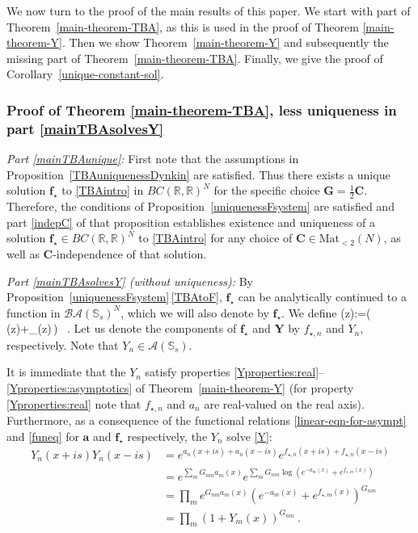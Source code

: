 \documentclass[12pt]{article}
\theoremstyle{plain}
\theoremstyle{definition}
\numberwithin{equation}{section}
\numberwithin{theorem}{section}
\def\be#1\ee{\begin{equation}#1\end{equation}}
\renewcommand{\vec}[1]{\mathbf{#1}}
\begin{document}
We now turn to the proof of the main results of this paper. We start with
	part of 
Theorem~\ref{main-theorem-TBA}, as this is used in the proof of Theorem \ref{main-theorem-Y}. 
	Then we show Theorem~\ref{main-theorem-Y} and subsequently the missing part of Theorem~\ref{main-theorem-TBA}.
Finally, we give the proof of Corollary~\ref{unique-constant-sol}.


\subsubsection*{Proof of Theorem \ref{main-theorem-TBA}, less uniqueness in part \ref{mainTBAsolvesY}}

\noindent 
{\em Part \ref{mainTBAunique}:} First note that the assumptions in Proposition~\ref{TBAuniquenessDynkin} are satisfied. Thus there exists a unique solution $\vec f_\star$ to \eqref{TBAintro} in $BC(\mathbb{R},\mathbb{R})^N$ for the specific choice $\vec G = \tfrac12 \vec C$. 
Therefore, the conditions of Proposition~\ref{uniquenessFsystem} are satisfied and part \ref{indepC} of that proposition establishes 
	existence and uniqueness of a solution $\vec f_\star \in BC(\mathbb{R},\mathbb{R})^N$ to \eqref{TBAintro} for any choice of $\vec C \in \mathrm{Mat}_{<2}(N)$, as well as
$\vec C$-independence
of that solution.

\medskip

\noindent 
{\em Part \ref{mainTBAsolvesY} (without uniqueness):} By Proposition~\ref{uniquenessFsystem}\,\ref{TBAtoF}, $\vec{f}_\star$ can be analytically continued to a function in $\mathcal{BA}(\mathbb{S}_s)^N$, which we will also denote by $\vec{f}_\star$.
We define
\be\label{Y-via-f*-proof}
	\vec{Y}(z):=\exp\!\big(\,\vec{a}(z)+\vec{f}_\star(z)\,\big) \ .
\ee
Let us denote the components of $\vec{f}_\star$ and $\vec{Y}$ by 
$f_{\star,n}$ and $Y_{n}$, respectively. Note that $Y_n \in \mathcal{A}(\mathbb{S}_s)$.

It is immediate that the $Y_n$ satisfy properties \ref{Yproperties:real}--\ref{Yproperties:asymptotics} of Theorem~\ref{main-theorem-Y} (for property \ref{Yproperties:real} note that $f_{\star,n}$ and $a_n$ are real-valued on the real axis).
Furthermore, 
as a consequence of the functional relations \eqref{linear-eqn-for-asympt} and \eqref{funeq} for $\vec{a}$ and $\vec{f}_\star$ respectively, the $Y_n$ solve \eqref{Y}:
\begin{align}
 Y_{n}(x+is)Y_{n}(x-is) &= e^{a_n(x+is)+a_n(x-is)}e^{f_{\star,n}(x+is)+f_{\star,n}(x-is)}\nonumber\\
 &= e^{\sum_m G_{nm}a_m(x)}e^{\sum_m G_{nm}\log\left(e^{-a_m(x)}+e^{f_{\star,m}(x)}\right)} \nonumber\\
 &= \prod_m e^{G_{nm}a_m(x)}\left(e^{-a_m(x)}+e^{f_{\star,m}(x)}\right)^{G_{nm}} \nonumber\\
 &= \prod_m \left(1 + Y_{m}(x) \right)^{G_{nm}} \ .
\end{align}
\end{document}
